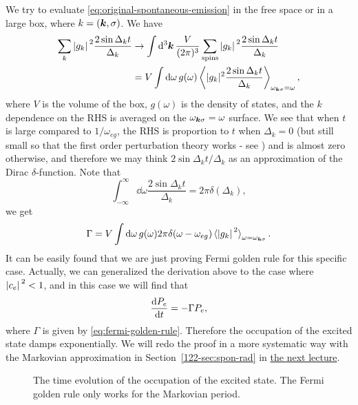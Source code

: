 \documentclass[hyperref, a4paper]{article}
\begin{document}
We try to evaluate \eqref{eq:original-spontaneous-emission} in the free space or in a large box, 
where $k = (\vb*{k}, \sigma)$. We have 
\[
    \begin{aligned}
        \sum_k \abs*{g_k}^2 \frac{2 \sin \Delta_k t  }{\Delta_k} 
        &\to \int \dd[3]{\vb*{k}} \frac{V}{(2\pi)^3} \sum_\text{spins} \abs*{g_k}^2 \frac{2 \sin \Delta_k t  }{\Delta_k}  \\
        &= V \int \dd{\omega} g(\omega) \expval{|g_k|^2 \frac{2 \sin \Delta_k t}{\Delta_k}}_{\omega_{\vb*{k} \sigma} = \omega},
    \end{aligned}
\]
where $V$ is the volume of the box, $g(\omega)$ is the density of states, and the $k$ dependence on the RHS 
is averaged on the $\omega_{\vb*{k} \sigma} = \omega$ surface. We see that when $t$ is large compared to 
$1 / \omega_{eg}$, the RHS is proportion to $t$ when $\Delta_k = 0$ (but still small so that the first order 
perturbation theory works - see ) and is almost zero otherwise, 
and therefore we may think ${2 \sin \Delta_k t} / {\Delta_k}$ as an approximation of the Dirac $\delta$-function.
Note that 
\[
    \int_{-\infty}^\infty \dd{\omega} \frac{2 \sin \Delta_k t}{\Delta_k} = 2 \pi \delta(\Delta_k),
\]
we get 
\begin{equation}
    \Gamma = V \int \dd{\omega} g(\omega) 2\pi \delta(\omega - \omega_{eg}) \expval*{\abs*{g_k}^2}_{\omega = \omega_{\vb*{k} \sigma}}.
    \label{eq:fermi-golden-rule}
\end{equation}
It can be easily found that we are just proving Fermi golden rule for this specific case.
Actually, we can generalized the derivation above to the case where $\abs*{c_e}^2 < 1$, and in this case 
we will find that 
\[
    \dv{P_e}{t} = - \Gamma P_e,
\]
where $\Gamma$ is given by \eqref{eq:fermi-golden-rule}. Therefore the occupation of the excited state 
damps exponentially. We will redo the proof in a more systematic way with the Markovian approximation in 
Section~\ref{122-sec:spon-rad} in \href{12-2.pdf}{the next lecture}. 

\begin{figure}
    \centering
    
    \caption{The time evolution of the occupation of the excited state. The Fermi golden rule only works for the 
    Markovian period. }
    \label{fig:pe-time-evo}
\end{figure}
\end{document}
